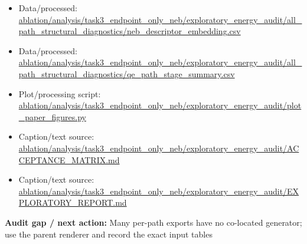 \documentclass[10pt]{article}
\newcommand{\statusline}[1]{\colorbox{gray!12}{\parbox{0.96\linewidth}{#1}}}
\begin{document}
\begin{itemize}[leftmargin=1.4em,noitemsep]
\item Data/processed: \begingroup\scriptsize\url{ablation/analysis/task3_endpoint_only_neb/exploratory_energy_audit/all_path_structural_diagnostics/neb_descriptor_embedding.csv}\endgroup
\item Data/processed: \begingroup\scriptsize\url{ablation/analysis/task3_endpoint_only_neb/exploratory_energy_audit/all_path_structural_diagnostics/qe_path_stage_summary.csv}\endgroup
\item Plot/processing script: \begingroup\scriptsize\url{ablation/analysis/task3_endpoint_only_neb/exploratory_energy_audit/plot_paper_figures.py}\endgroup
\item Caption/text source: \begingroup\scriptsize\url{ablation/analysis/task3_endpoint_only_neb/exploratory_energy_audit/ACCEPTANCE_MATRIX.md}\endgroup
\item Caption/text source: \begingroup\scriptsize\url{ablation/analysis/task3_endpoint_only_neb/exploratory_energy_audit/EXPLORATORY_REPORT.md}\endgroup
\end{itemize}
\statusline{\textbf{Audit gap / next action:} Many per-path exports have no co-located generator; use the parent renderer and record the exact input tables}
\vfill
\clearpage
\end{document}
